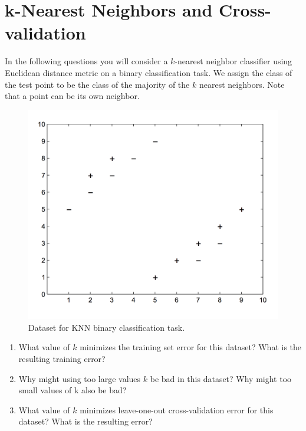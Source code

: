 \documentclass[11pt]{article}
\begin{document}
\section{k-Nearest Neighbors and Cross-validation }
In the following questions you will consider a $k$-nearest neighbor classifier using Euclidean
distance metric on a binary classification task. 
We assign the class of the test point to be the
class of the majority of the $k$ nearest neighbors. 
Note that a point can be its own neighbor.
\begin{figure}[h]
    \centering
    \includegraphics[scale=0.45]{knn_figure.png}
    \caption{Dataset for KNN binary classification task.}
    \label{fig:knn}
\end{figure}

\begin{enumerate}
    \item {} What value of $k$ minimizes the training set error for this dataset? What is
the resulting training error?
    \item {} Why might using too large values $k$ be bad in this dataset? Why might too
small values of k also be bad?
    \item {} What value of $k$ minimizes leave-one-out cross-validation error for this
dataset? What is the resulting error?
\end{enumerate}

\end{document}
